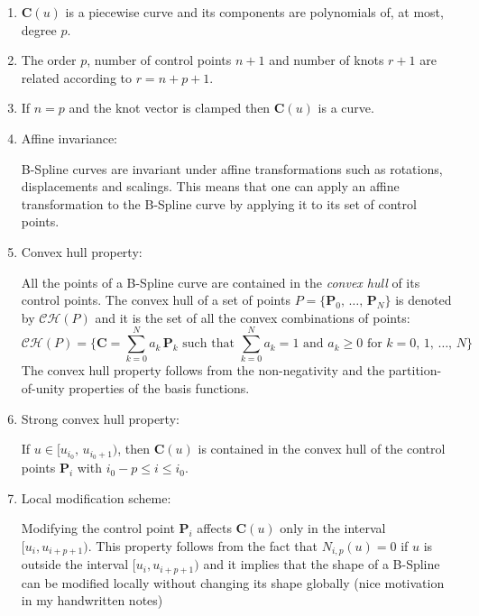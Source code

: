 \begin{enumerate}

    \item $\mathbf{C}(u)$ is a piecewise curve and its components are polynomials of, at most, degree $p$.
    
    \item The order $p$, number of control points $n+1$ and number of knots $r+1$ are related according to $r = n + p + 1$.
    
    \item If $n = p$ and the knot vector is clamped then $\mathbf{C}(u)$ is a \Bezier curve.
    
    
    \item Affine invariance:
    
    B-Spline curves are invariant under affine transformations such as rotations, displacements and scalings. This means that one can apply an affine transformation to the B-Spline curve by applying it to its set of control points.
    
    \item Convex hull property:
    
    All the points of a B-Spline curve are contained in the \textit{convex hull} of its control points.
    The convex hull of a set of points $P = \{\mathbf{P}_{0},\, \dots,\, \mathbf{P}_{N}\}$ is denoted by $\mathcal{CH}(P)$ and it is the set of all the convex combinations of points:
    \begin{equation*}
     \mathcal{CH}(P) = \Big\{ \mathbf{C} =  \sum_{k=0}^{N} a_{k} \, \mathbf{P}_{k} \text{ such that } \sum_{k=0}^{N} a_{k} = 1 \text{ and } a_{k}\geq 0 \text{ for } k = 0,\, 1,\, \dots,\, N\Big\}
    \end{equation*}
    The convex hull property follows from the non-negativity and the partition-of-unity properties of the basis functions.
    
    \item Strong convex hull property:
    
    If $u \in [u_{i_{0}},\, u_{i_{0}+1})$, then $\mathbf{C}(u)$ is contained in the convex hull of the control points $\boldsymbol{P}_{i}$ with $i_{0}-p \leq i \leq i_{0}$.

    \item Local modification scheme:
    
    Modifying the control point $\mathbf{P}_{i}$ affects $\mathbf{C}(u)$ only in the interval $[u_{i}, u_{i+p+1})$. This property follows from the fact that $N_{i,p}(u)=0$ if $u$ is outside the interval $[u_{i}, u_{i+p+1})$ and it implies that the shape of a B-Spline can be modified locally without changing its shape globally (nice motivation in my handwritten notes)
    

\end{enumerate}
